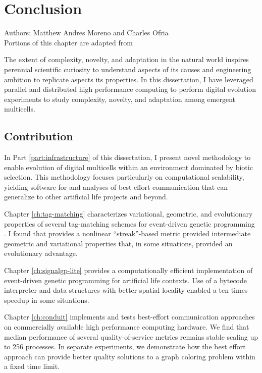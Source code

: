 \chapter{Conclusion}
\label{ch:conclusion}

\noindent
Authors: Matthew Andres Moreno and Charles Ofria \\
Portions of this chapter are adapted from ~\citep{moreno2020practical}

The extent of complexity, novelty, and adaptation in the natural world inspires perennial scientific curiosity to understand aspects of its causes and engineering ambition to replicate aspects its properties.
In this dissertation, I have leveraged parallel and distributed high performance computing to perform digital evolution experiments to study complexity, novelty, and adaptation among emergent multicells.

\section{Contribution}

In Part \ref{part:infrastructure} of this dissertation, I present novel methodology to enable evolution of digital multicells within an environment dominated by biotic selection.
This methodology focuses particularly on computational scalability, yielding software for and analyses of best-effort communication that can generalize to other artificial life projects and beyond.

Chapter \ref{ch:tag-matching} characterizes variational, geometric, and evolutionary properties of several tag-matching schemes for event-driven genetic programming \citep{lalejini2018evolving}.
I found that provides a nonlinear ``streak''-based metric \citep{downing2015intelligence} provided intermediate geometric and variational properties that, in some situations, provided an evolutionary advantage.

Chapter \ref{ch:signalgp-lite} provides a computationally efficient implementation of event-driven genetic programming for artificial life contexts.
Use of a bytecode interpreter and data structures with better spatial locality enabled a ten times speedup in some situations.

Chapter \ref{ch:conduit} implements and tests best-effort communication approaches on commercially available high performance computing hardware.
We find that median performance of several quality-of-service metrics remains stable scaling up to 256 processes.
In separate experiments, we demonstrate how the best effort approach can provide better quality solutions to a graph coloring problem within a fixed time limit.

